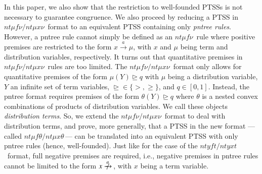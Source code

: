 \documentclass[submission,copyright,creativecommons]{eptcs}
\newcommand{\trans}[1][]{\xrightarrow{\, {#1} \, }}
\newcommand{\ntrans}[1][]{\mathrel{{\trans[#1]}\makebox[0em][r]{$\not$\hspace{2ex}}}{\!}}
\newcommand{\gtgeq}{\trianglerighteq}
\newcommand{\ntmufnu}{\ensuremath{\textit{nt}\mu\textit{f}\nu}}
\newcommand{\ntmuxnu}{\ensuremath{\textit{nt}\mu\textit{x}\nu}}
\newcommand{\ntmufxnu}{\ensuremath{\ntmufnu\textit{/}\ntmuxnu}}
\newcommand{\ntmuft}{\ensuremath{\textit{nt}\mu\textit{f}\theta}}
\newcommand{\ntmuxt}{\ensuremath{\textit{nt}\mu\textit{x}\theta}}
\newcommand{\ntmufxt}{\ensuremath{\ntmuft\textit{/}\ntmuxt}}
\newcommand{\ntyft}{\ensuremath{\textit{ntyft}}}
\newcommand{\ntyxt}{\ensuremath{\textit{ntyxt}}}
\newcommand{\ntyfxt}{\ensuremath{\ntyft\textit{/}\ntyxt}}
\begin{document}
In this paper, we also show that the restriction to well-founded PTSSs
is not necessary to guarantee congruence. We also proceed by
reducing a PTSS in \ntmufxnu\ format to an equivalent PTSS containing
only \textit{pntree rules}.
However, a pntree rule cannot simply be defined as an \ntmufnu\ rule
where positive premises are restricted to the form $x\trans[a]\mu$,
with $x$ and $\mu$ being term and distribution variables, respectively.
It turns out that quantitative premises in \ntmufxnu\ rules are
too limited.  The \ntmufxnu\ format only allows for
quantitative premises of the form $\mu(Y)\gtgeq q$ with $\mu$ being a
distribution variable, $Y$ an infinite set of term variables,
${\gtgeq}\in\{>,\geq\}$, and $q\in[0,1]$.
Instead, the pntree format requires premises of the form
$\theta(Y)\gtgeq q$ where $\theta$ is a nested convex combinations of
products of distribution variables.  We call these objects
\emph{distribution terms}.
So, we extend the \ntmufxnu\ format to deal with distribution terms, and prove, more generally, that a
PTSS in the new format ---\,called \ntmufxt\,--- can be translated into an equivalent PTSS
with only pntree rules (hence, well-founded).
Just like for the case of the \ntyfxt\ format, full negative
premises are required, i.e., negative premises in pntree rules cannot
be limited to the form $x\ntrans[a]$, with $x$ being a term
variable.

\medskip
\end{document}
